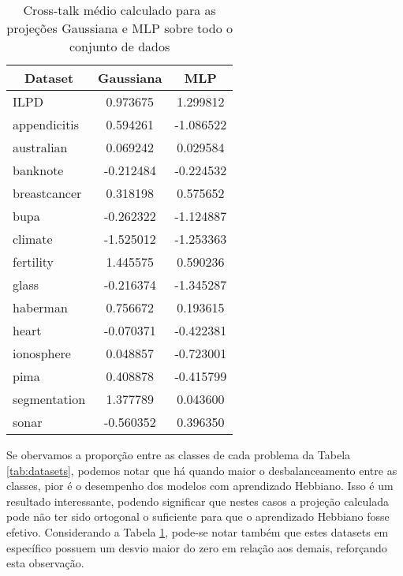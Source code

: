 \documentclass[conference]{IEEEtran}
\begin{document}
	\begin{table}[thpbh]
		\centering
		\label{tab:crosstalk}
		\caption{Cross-talk médio calculado para as projeções Gaussiana e MLP sobre todo o conjunto de dados}
		\begin{tabular}{|l|c|c|}
			\hline
			\multicolumn{1}{|c|}{\textbf{Dataset}} & \textbf{Gaussiana} & \textbf{MLP} \\ \hline
			ILPD                                   & 0.973675     & 1.299812     \\ \hline
			appendicitis                           & 0.594261     & -1.086522    \\ \hline
			australian                             & 0.069242     & 0.029584     \\ \hline
			banknote                               & -0.212484    & -0.224532    \\ \hline
			breastcancer                           & 0.318198     & 0.575652     \\ \hline
			bupa                                   & -0.262322    & -1.124887    \\ \hline
			climate                                & -1.525012    & -1.253363    \\ \hline
			fertility                              & 1.445575     & 0.590236     \\ \hline
			glass                                  & -0.216374    & -1.345287    \\ \hline
			haberman                               & 0.756672     & 0.193615     \\ \hline
			heart                                  & -0.070371    & -0.422381    \\ \hline
			ionosphere                             & 0.048857     & -0.723001    \\ \hline
			pima                                   & 0.408878     & -0.415799    \\ \hline
			segmentation                           & 1.377789     & 0.043600     \\ \hline
			sonar                                  & -0.560352    & 0.396350     \\ \hline
		\end{tabular}
	\end{table}


	Se obervamos a proporção entre as classes de cada problema da Tabela \ref{tab:datasets}, podemos notar que há quando maior o desbalanceamento entre as classes, pior é o desempenho dos modelos com aprendizado Hebbiano. Isso é um resultado interessante, podendo significar que nestes casos a projeção calculada pode não ter sido ortogonal o suficiente para que o aprendizado Hebbiano fosse efetivo. Considerando a Tabela \ref{tab:crosstalk}, pode-se notar também que estes datasets em específico possuem um desvio maior do zero em relação aos demais, reforçando esta observação.
\end{document}
